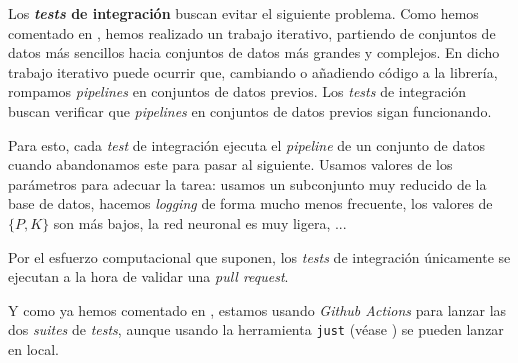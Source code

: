 Los \textbf{\textit{tests} de integración} buscan evitar el siguiente problema. Como hemos comentado en , hemos realizado un trabajo iterativo, partiendo de conjuntos de datos más sencillos hacia conjuntos de datos más grandes y complejos. En dicho trabajo iterativo puede ocurrir que, cambiando o añadiendo código a la librería, rompamos \textit{pipelines} en conjuntos de datos previos. Los \textit{tests} de integración buscan verificar que \textit{pipelines} en conjuntos de datos previos sigan funcionando.

Para esto, cada \textit{test} de integración ejecuta el \textit{pipeline} de un conjunto de datos cuando abandonamos este para pasar al siguiente. Usamos valores de los parámetros para adecuar la tarea: usamos un subconjunto muy reducido de la base de datos, hacemos \textit{logging} de forma mucho menos frecuente, los valores de $\{P, K\}$ son más bajos, la red neuronal es muy ligera, ...

Por el esfuerzo computacional que suponen, los \textit{tests} de integración únicamente se ejecutan a la hora de validar una \textit{pull request}.

Y como ya hemos comentado en , estamos usando \textit{Github Actions} para lanzar las dos \textit{suites} de \textit{tests}, aunque usando la herramienta \lstinline{just} (véase ) se pueden lanzar en local.
